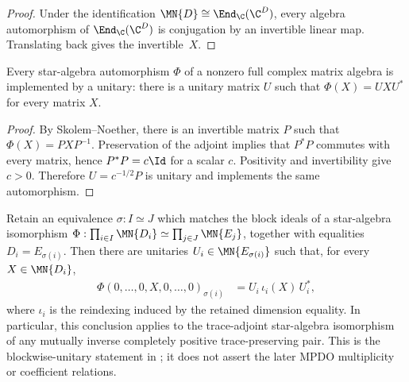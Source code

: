 \begin{proof}
    \leanok
    Under the identification $\MN{D} \cong \End_{\C}(\C^D)$, every
    algebra automorphism of $\End_{\C}(\C^D)$ is conjugation by an
    invertible linear map. Translating back gives the invertible~$X$.
\end{proof}

\begin{theorem}%
    \label{thm:unitary_skolem_noether_matrix}
    \leanok
    Every star-algebra automorphism $\Phi$ of a nonzero full complex matrix
    algebra is implemented by a unitary: there is a unitary matrix $U$ such
    that $\Phi(X)=UXU^*$ for every matrix $X$.
\end{theorem}

\begin{proof}\leanok
    By Skolem--Noether, there is an invertible matrix $P$ such that
    $\Phi(X)=PXP^{-1}$. Preservation of the adjoint implies that $P^*P$
    commutes with every matrix, hence $P^*P=c\Id$ for a scalar $c$.
    Positivity and invertibility give $c>0$. Therefore $U=c^{-1/2}P$ is
    unitary and implements the same automorphism.
\end{proof}

\begin{theorem}%
    \label{thm:direct_sum_star_equiv_block_unitary}
    \leanok
    Retain an equivalence $\sigma:I\simeq J$ which matches the block ideals
    of a star-algebra isomorphism
    $\Phi:\prod_{i\in I}\MN{D_i}\simeq\prod_{j\in J}\MN{E_j}$,
    together with equalities $D_i=E_{\sigma(i)}$. Then there are unitaries
    $U_i\in\MN{E_{\sigma(i)}}$ such that, for every
    $X\in\MN{D_i}$,
    \begin{align}
        \Phi(0,\ldots,0,X,0,\ldots,0)_{\sigma(i)}
         & =U_i\,\iota_i(X)\,U_i^*,
        \label{eq:spectral_ds_block_unitary}
    \end{align}
    where $\iota_i$ is the reindexing induced by the retained dimension
    equality. In particular, this conclusion applies to the trace-adjoint
    star-algebra isomorphism of any mutually inverse completely positive
    trace-preserving pair. This is the blockwise-unitary statement in
    \cite[Appendix~C.4, line~1997]{Cirac2016MPDO_arXiv}; it does not assert
    the later MPDO multiplicity or coefficient relations.
\end{theorem}

